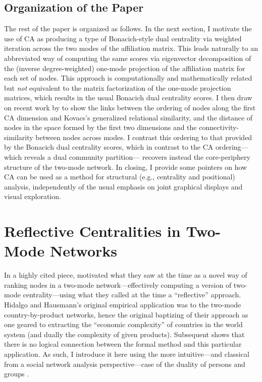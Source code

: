 \documentclass[a4paper,fleqn]{cas-sc}
\begin{document}
\subsection{Organization of the Paper}
The rest of the paper is organized as follows. In the next section, I motivate the use of CA as producing a type of Bonacich-style dual centrality via weighted iteration across the two modes of the affiliation matrix. This leads naturally to an abbreviated way of computing the same scores via eigenvector decomposition of the (inverse degree-weighted) one-mode projection of the affiliation matrix for each set of nodes. This approach is computationally and mathematically related but \textit{not} equivalent to the matrix factorization of the one-mode projection matrices, which results in the usual Bonacich dual centrality scores. I then draw on recent work by \citet{van2021correspondence} to show the links between the ordering of nodes along the first CA dimension and Kovacs's generalized relational similarity, and the distance of nodes in the space formed by the first two dimensions and the connectivity-similarity between nodes across modes. I contrast this ordering to that provided by the Bonacich dual centrality scores, which in contrast to the CA ordering---which reveals a dual community partition--- recovers instead the core-periphery structure of the two-mode network. In closing, I provide some pointers on how CA can be used as a method for structural (e.g., centrality and positional) analysis, independently of the usual emphasis on joint graphical displays and visual exploration. 

\section{Reflective Centralities in Two-Mode Networks}
In a highly cited piece, \citet{hidalgo2009building} motivated what they saw at the time as a novel way of ranking nodes in a two-mode network---effectively computing a version of two-mode centrality---using what they called at the time a ``reflective'' approach. Hidalgo and Hausmann's original empirical application was to the two-mode country-by-product networks, hence the original baptizing of their approach as one geared to extracting the ``economic complexity'' of countries in the world system (and dually the complexity of given products). Subsequent shows that there is no logical connection between the formal method and this particular application. As such, I introduce it here using the more intuitive---and classical from a social network analysis perspective---case of the duality of persons and groups \citep{breiger1974duality}. 
\end{document}
